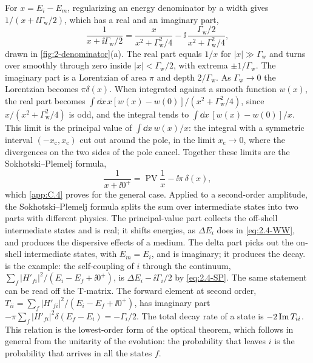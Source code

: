 For $x = E_i - E_m$, regularizing an energy denominator by a width gives $1/(x + \ii\varGamma_{\mathrm{w}}/2)$, which has a real and an imaginary part,
\begin{equation*}
  \frac{1}{x + \ii\varGamma_{\mathrm{w}}/2} = \frac{x}{x^2 + \varGamma_{\mathrm{w}}^2/4} - \ii\,\frac{\varGamma_{\mathrm{w}}/2}{x^2 + \varGamma_{\mathrm{w}}^2/4} ,
\end{equation*}
drawn in \cref{fig:2-denominator}(a). The real part equals $1/x$ for $|x| \gg \varGamma_{\mathrm{w}}$ and turns over smoothly through zero inside $|x| < \varGamma_{\mathrm{w}}/2$, with extrema $\pm1/\varGamma_{\mathrm{w}}$. The imaginary part is a Lorentzian of area $\pi$ and depth $2/\varGamma_{\mathrm{w}}$. As $\varGamma_{\mathrm{w}} \to 0$ the Lorentzian becomes $\pi\delta(x)$. When integrated against a smooth function $w(x)$, the real part becomes $\int\dd x\,x[w(x) - w(0)]/(x^2 + \varGamma_{\mathrm{w}}^2/4)$, since $x/(x^2 + \varGamma_{\mathrm{w}}^2/4)$ is odd, and the integral tends to $\int\dd x\,[w(x) - w(0)]/x$. This limit is the principal value of $\int\dd x\,w(x)/x$: the integral with a symmetric interval $(-x_{\mathrm{c}}, x_{\mathrm{c}})$ cut out around the pole, in the limit $x_{\mathrm{c}} \to 0$, where the divergences on the two sides of the pole cancel. Together these limits are the Sokhotski--Plemelj formula,
\begin{equation}
  \frac{1}{x + \ii0^+} = \operatorname{PV}\frac{1}{x} - \ii\pi\,\delta(x) ,
  \label{eq:2.4-SP}
\end{equation}
which \cref{app:C.4} proves for the general case. Applied to a second-order amplitude, the Sokhotski--Plemelj formula splits the sum over intermediate states into two parts with different physics. The principal-value part collects the off-shell intermediate states and is real; it shifts energies, as $\Delta E_i$ does in \cref{eq:2.4-WW}, and produces the dispersive effects of a medium. The delta part picks out the on-shell intermediate states, with $E_m = E_i$, and is imaginary; it produces the decay.  is the example: the self-coupling of $i$ through the continuum, $\sum_f|H'_{fi}|^2/(E_i - E_f + \ii0^+)$, is $\Delta E_i - \ii\varGamma_i/2$ by \cref{eq:2.4-SP}. The same statement can be read off the T-matrix. The forward element at second order, $T_{ii} = \sum_f|H'_{fi}|^2/(E_i - E_f + \ii0^+)$, has imaginary part $-\pi\sum_f|H'_{fi}|^2\delta(E_f - E_i) = -\varGamma_i/2$. The total decay rate of a state is $-2\operatorname{Im} T_{ii}$. This relation is the lowest-order form of the optical theorem, which follows in general from the unitarity of the evolution: the probability that leaves $i$ is the probability that arrives in all the states $f$.

